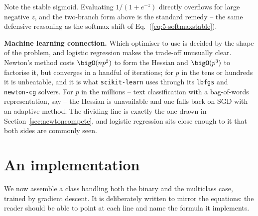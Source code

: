 Note the stable sigmoid.  Evaluating $1/(1+e^{-z})$ directly overflows for
large negative $z$, and the two-branch form above is the standard remedy --
the same defensive reasoning as the softmax shift of
Eq.~(\ref{eq:5-softmaxstable}).

\begin{notebox}
\textbf{Machine learning connection.} Which optimiser to use is decided by the
shape of the problem, and logistic regression makes the trade-off unusually
clear.  Newton's method costs $\bigO(np^{2})$ to form the Hessian and
$\bigO(p^{3})$ to factorise it, but converges in a handful of iterations; for
$p$ in the tens or hundreds it is unbeatable, and it is what
\texttt{scikit-learn} uses through its \texttt{lbfgs} and \texttt{newton-cg}
solvers.  For $p$ in the millions -- text classification with a bag-of-words
representation, say -- the Hessian is unavailable and one falls back on SGD
with an adaptive method.  The dividing line is exactly the one drawn in
Section~\ref{sec:newtoncompete}, and logistic regression sits close enough to
it that both sides are commonly seen.
\end{notebox}

\section{An implementation}
\label{sec:logregcode}

We now assemble a class handling both the binary and the multiclass case,
trained by gradient descent.  It is deliberately written to mirror the
equations: the reader should be able to point at each line and name the
formula it implements.

